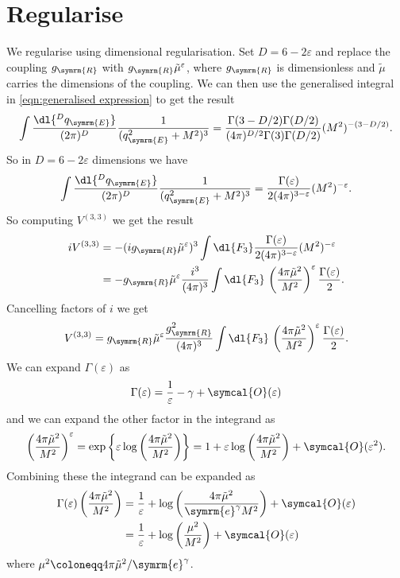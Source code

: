 \documentclass[fleqn]{NotesClass}
\newcommand{\e}{\symrm{e}}
\newcommand{\order}{\symcal{O}}
\newcommand{\renormalised}{\symrm{R}}
\begin{document}
    \section{Regularise}
    We regularise using dimensional regularisation.
    Set \(D = 6 - 2\varepsilon\) and replace the coupling \(g_{\renormalised}\) with \(g_{\renormalised}\tilde{\mu}^{\varepsilon}\), where \(g_{\renormalised}\) is dimensionless and \(\tilde{\mu}\) carries the dimensions of the coupling.
    We can then use the generalised integral in \cref{eqn:generalised expression} to get the result
    \begin{equation}
        \int \frac{\dl{^Dq_{\symrm{E}}}}{(2\pi)^D} \frac{1}{(q_{\symrm{E}}^2 + M^2)^3} = \frac{\Gamma(3 - D/2)\Gamma(D/2)}{(4\pi)^{D/2}\Gamma(3)\Gamma(D/2)} (M^2)^{-(3-D/2)}.
    \end{equation}
    So in \(D = 6 - 2\varepsilon\) dimensions we have
    \begin{equation}
        \int \frac{\dl{^Dq_{\symrm{E}}}}{(2\pi)^D} \frac{1}{(q_{\symrm{E}}^2 + M^2)^3} = \frac{\Gamma(\varepsilon)}{2(4\pi)^{3-\varepsilon}} (M^2)^{-\varepsilon}.
    \end{equation}
    So computing \(V^{(3,3)}\) we get the result
    \begin{align}
        iV^{(3,3)} &= -(ig_{\renormalised}\tilde{\mu}^{\varepsilon})^3 \int \dl{F_3} \frac{\Gamma(\varepsilon)}{2(4\pi)^{3-\varepsilon}} (M^2)^{-\varepsilon}\\
        &= -g_{\renormalised}\tilde{\mu}^\varepsilon \frac{i^3}{(4\pi)^3} \int \dl{F_3} \, \left( \frac{4\pi\tilde{\mu}^2}{M^2} \right)^\varepsilon \frac{\Gamma(\varepsilon)}{2}.
    \end{align}
    Cancelling factors of \(i\) we get
    \begin{equation}
        V^{(3, 3)} = g_{\renormalised} \tilde{\mu}^\varepsilon \frac{g_{\renormalised}^2}{(4\pi)^3} \int \dl{F_3} \, \left( \frac{4\pi\tilde{\mu}^2}{M^2} \right)^\varepsilon \frac{\Gamma(\varepsilon)}{2}.
    \end{equation}
    We can expand \(\Gamma(\varepsilon)\) as
    \begin{equation}
        \Gamma(\varepsilon) = \frac{1}{\varepsilon} - \gamma + \order(\varepsilon)
    \end{equation}
    and we can expand the other factor in the integrand as
    \begin{equation}
        \left( \frac{4\pi \tilde{\mu}^2}{M^2} \right)^\varepsilon = \exp\left\{ \varepsilon \log\left( \frac{4\pi\tilde{\mu}^2}{M^2} \right) \right\} = 1 + \varepsilon\log\left( \frac{4\pi\tilde{\mu}^2}{M^2} \right) + \order(\varepsilon^2).
    \end{equation}
    Combining these the integrand can be expanded as
    \begin{align}
        \Gamma(\varepsilon) \left( \frac{4\pi \tilde{\mu}^2}{M^2} \right) &= \frac{1}{\varepsilon} + \log\left( \frac{4\pi\tilde{\mu}^2}{\e^{\gamma}M^2} \right) + \order(\varepsilon)\\
        &= \frac{1}{\varepsilon} + \log\left( \frac{\mu^2}{M^2} \right) + \order(\varepsilon)
    \end{align}
    where \(\mu^2 \coloneqq 4\pi\tilde{\mu}^2 / \e^{\gamma}\).
    
\end{document}
